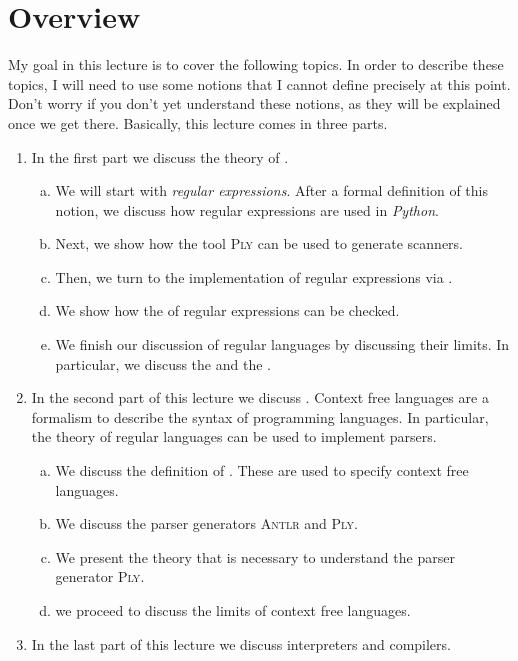 \section{Overview}
My goal in this lecture is to cover the following topics.  In order to describe these topics, I will need to
use some notions that I cannot define precisely at this point.  Don't worry if you don't yet understand these 
notions, as they will be explained once we get there.  Basically, this lecture comes in three parts.
\begin{enumerate}
\item In the first part we discuss the theory of .
  \begin{enumerate}[(a)]
  \item We will start with \emph{regular expressions}.  After a formal definition of this notion,
        we discuss how regular expressions are used in \textsl{Python}.
  \item Next, we show how the tool \textsc{Ply} can be used to generate scanners.
  \item Then, we turn to the implementation of regular expressions via .
  \item We show how the  of regular expressions can be checked.
  \item We finish our discussion of regular languages by discussing their limits.
        In particular, we discuss the  and the .
  \end{enumerate}
\item In the second part of this lecture we discuss .
      Context free languages are a formalism to describe the syntax of programming languages.
      In particular, the theory of regular languages can be used to implement parsers.
      \begin{enumerate}[(a)]
      \item We discuss the definition of .  These are used to specify 
            context free languages.  
      \item We discuss the parser generators \textsc{Antlr} and \textsc{Ply}.
      \item We present the theory that is necessary to understand the parser generator \textsc{Ply}.
      \item we proceed to discuss the limits of context free languages.
      \end{enumerate}
\item In the last part of this lecture we discuss interpreters and compilers.
\end{enumerate}

